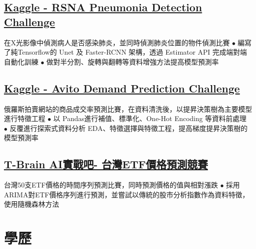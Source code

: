 \documentclass[11pt,a4paper]{moderncv}
\begin{document}
\subsection{\href{https://www.kaggle.com/c/rsna-pneumonia-detection-challenge}{\small Kaggle - RSNA Pneumonia Detection Challenge}}
{\footnotesize{在X光影像中偵測病人是否感染肺炎，並同時偵測肺炎位置的物件偵測比賽
\newline $\bullet$ 編寫了純Tensorflow的 Unet 及 Faster-RCNN 架構，透過 Estimator API 完成端對端自動化訓練
\newline $\bullet$ 做對半分割、旋轉與翻轉等資料增強方法提高模型預測率}}

\subsection{\href{https://www.kaggle.com/c/avito-demand-prediction}{\small Kaggle - Avito Demand Prediction Challenge}}
{\footnotesize{俄羅斯拍賣網站的商品成交率預測比賽，在資料清洗後，以提昇決策樹為主要模型進行特徵工程
\newline $\bullet$ 以 Pandas進行補值、標準化、One-Hot Encoding 等資料前處理
\newline $\bullet$ 反覆進行探索式資料分析 EDA、特徵選擇與特徵工程，提高梯度提昇決策樹的模型預測率}}

\subsection{\href{https://tbrain.trendmicro.com.tw/Competitions/Details/2}{\small T-Brain AI實戰吧- 台灣ETF價格預測競賽}}
\cvline{}
{\footnotesize{
台灣50支ETF價格的時間序列預測比賽，同時預測價格的值與相對漲跌
\newline $\bullet$ 採用ARIMA對ETF價格序列進行預測，並嘗試以傳統的股市分析指數作為資料特徵，使用隨機森林方法}}
\vspace{-0.8\baselineskip}

\section{學歷}
\vspace{-0.8\baselineskip}
\end{document}
